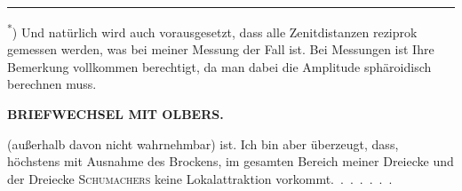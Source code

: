 \par\smallskip\noindent\rule{.24\textwidth}{.4pt}\par\smallskip
{\footnotesize
\noindent\hspace*{.06\linewidth}\textsuperscript{*}) Und natürlich wird auch vorausgesetzt, dass alle Zenitdistanzen reziprok gemessen werden, was bei meiner Messung  der Fall ist.
Bei  Messungen ist Ihre Bemerkung vollkommen berechtigt, da man dabei die Amplitude sphäroidisch berechnen muss.\par
}

\clearpage
\noindent{}\hfill{\small\textbf{BRIEFWECHSEL MIT OLBERS.}}\hfill\null\par\medskip
\noindent (außerhalb davon nicht wahrnehmbar) ist.
Ich bin aber überzeugt, dass, höchstens mit Ausnahme des Brockens, im gesamten Bereich meiner Dreiecke und der Dreiecke \textsc{Schumachers} keine  Lokalattraktion vorkommt.\ \mbox{.\ .\ .\ .\ .\ .}

